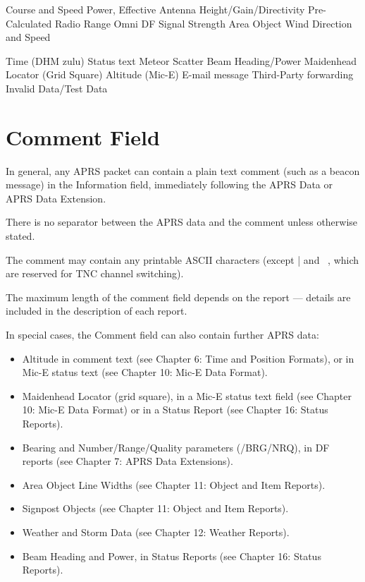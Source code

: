 Course and Speed
Power, Effective Antenna Height/Gain/Directivity
Pre-Calculated Radio Range
Omni DF Signal Strength
Area Object
Wind Direction and Speed

Time (DHM zulu)
Status text
Meteor Scatter Beam Heading/Power
Maidenhead Locator (Grid Square)
Altitude (Mic-E)
E-mail message
Third-Party forwarding
Invalid Data/Test Data


\section{Comment Field}

In general, any APRS packet can contain a plain text comment (such as a
beacon message) in the Information field, immediately following the APRS
Data or APRS Data Extension.

There is no separator between the APRS data and the comment unless
otherwise stated.

The comment may contain any printable ASCII characters (except | and ~,
which are reserved for TNC channel switching).

The maximum length of the comment field depends on the report — details
are included in the description of each report.

In special cases, the Comment field can also contain further APRS data:

\begin{itemize}


\item Altitude in comment text (see Chapter 6: Time and Position Formats), or
in Mic-E status text (see Chapter 10: Mic-E Data Format).

\item Maidenhead Locator (grid square), in a Mic-E status text field (see
Chapter 10: Mic-E Data Format) or in a Status Report (see Chapter 16:
Status Reports).

\item Bearing and Number/Range/Quality parameters (/BRG/NRQ), in DF
reports (see Chapter 7: APRS Data Extensions).

\item Area Object Line Widths (see Chapter 11: Object and Item Reports).

\item Signpost Objects (see Chapter 11: Object and Item Reports).

\item Weather and Storm Data (see Chapter 12: Weather Reports).

\item Beam Heading and Power, in Status Reports (see Chapter 16: Status
Reports).

\end{itemize}


